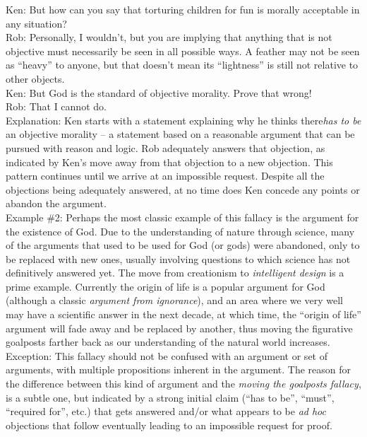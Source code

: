 \documentclass[a4paper,12pt,single,pdftex]{scrartcl}
\begin{document}
    
      Ken: But how can you say that torturing children for fun is morally acceptable in any situation?
    \\

    
      Rob: Personally, I wouldn’t, but you are implying that anything that is not objective must necessarily be seen in all possible ways. A feather may not be seen as “heavy” to anyone, but that doesn’t mean its “lightness” is still not relative to other objects.
    \\

    
      Ken: But God is the standard of objective morality.  Prove that wrong!
    \\

    
      Rob: That I cannot do.
    \\

    
      Explanation: Ken starts with a statement explaining why he thinks there{\it  has to be} an objective morality -- a statement based on a reasonable argument that can be pursued with reason and logic.  Rob adequately answers that objection, as indicated by Ken’s move away from that objection to a new objection.  This pattern continues until we arrive at an impossible request.  Despite all the objections being adequately answered, at no time does Ken concede any points or abandon the argument.
    \\

    
      Example \#2: Perhaps the most classic example of this fallacy is the argument for the existence of God.  Due to the understanding of nature through science, many of the arguments that used to be used for God (or gods) were abandoned, only to be replaced with new ones, usually involving questions to which science has not definitively answered yet.  The move from creationism to {\it intelligent design} is a prime example.  Currently the origin of life is a popular argument for God (although a classic {\it argument from ignorance}), and an area where we very well may have a scientific answer in the next decade, at which time, the “origin of life” argument will fade away and be replaced by another, thus moving the figurative goalposts farther back as our understanding of the natural world increases.
    \\

    
      Exception: This fallacy should not be confused with an argument or set of arguments, with multiple propositions inherent in the argument.  The reason for the difference between this kind of argument and the {\it moving the goalposts fallacy}, is a subtle one, but indicated by a strong initial claim (“has to be”, “must”, “required for”, etc.) that gets answered and/or what appears to be {\it ad hoc} objections that follow eventually leading to an impossible request for proof.
    \\
\end{document}
